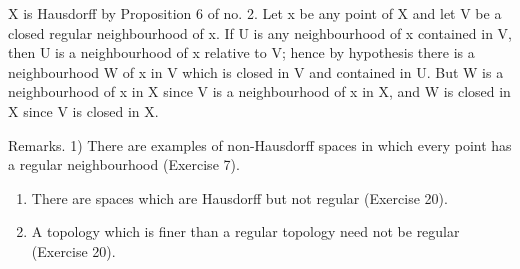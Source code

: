 X is Hausdorff by Proposition 6 of no. 2. Let x be any point of X and let V be a closed regular neighbourhood of x. If U is any neighbourhood of x contained in V, then U is a neighbourhood of x relative to V; hence by hypothesis there is a neighbourhood W of x in V which is closed in V and contained in U. But W is a neighbourhood of x in X since V is a neighbourhood of x in X, and W is closed in X since V is closed in X.

Remarks. 1) There are examples of non-Hausdorff spaces in which every point has a regular neighbourhood (Exercise 7).

\begin{enumerate}
\def\labelenumi{\arabic{enumi})}
\setcounter{enumi}{1}
\item
  There are spaces which are Hausdorff but not regular (Exercise 20).
\item
  A topology which is finer than a regular topology need not be regular (Exercise 20).
\end{enumerate}

